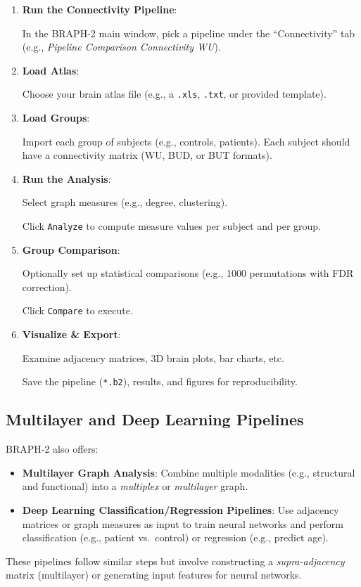 \documentclass[justified]{tufte-handout}
\begin{document}
\begin{enumerate}

\item \textbf{Run the Connectivity Pipeline}:

In the BRAPH-2 main window, pick a pipeline under the ``Connectivity'' tab (e.g., \textit{Pipeline Comparison Connectivity WU}).

\item \textbf{Load Atlas}:

Choose your brain atlas file (e.g., a \texttt{.xls}, \texttt{.txt}, or provided template).


\item \textbf{Load Groups}:

Import each group of subjects (e.g., controls, patients). Each subject should have a connectivity matrix (WU, BUD, or BUT formats).


\item \textbf{Run the Analysis}:

Select graph measures (e.g., degree, clustering).

Click \texttt{Analyze} to compute measure values per subject and per group.


\item \textbf{Group Comparison}:

Optionally set up statistical comparisons (e.g., 1000 permutations with FDR correction).

Click \texttt{Compare} to execute.


\item \textbf{Visualize \& Export}:

Examine adjacency matrices, 3D brain plots, bar charts, etc.

Save the pipeline (\texttt{*.b2}), results, and figures for reproducibility.

\end{enumerate}

\subsection{Multilayer and Deep Learning Pipelines}

BRAPH-2 also offers:
\begin{itemize}

\item \textbf{Multilayer Graph Analysis}: Combine multiple modalities (e.g., structural and functional) into a \textit{multiplex} or \textit{multilayer} graph.

\item \textbf{Deep Learning Classification/Regression Pipelines}: Use adjacency matrices or graph measures as input to train neural networks and perform classification (e.g., patient vs.\ control) or regression (e.g., predict age).

\end{itemize}
These pipelines follow similar steps but involve constructing a \textit{supra-adjacency} matrix (multilayer) or generating input features for neural networks.
\end{document}
